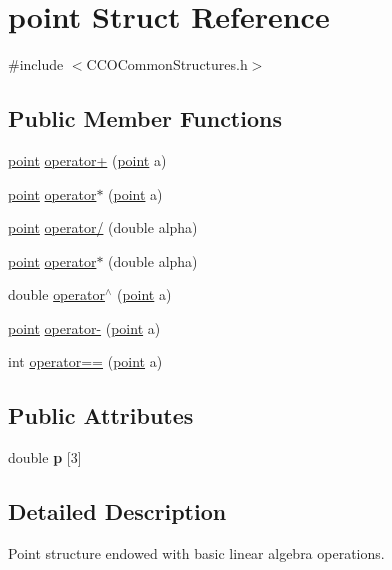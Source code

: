 \hypertarget{structpoint}{}\section{point Struct Reference}
\label{structpoint}


{\ttfamily \#include $<$C\+C\+O\+Common\+Structures.\+h$>$}

\subsection*{Public Member Functions}
\begin{DoxyCompactItemize}
\item 
\hyperlink{structpoint}{point} \hyperlink{structpoint_a4c712881b83fd79c9039ccdd5cb99937}{operator+} (\hyperlink{structpoint}{point} a)
\item 
\hyperlink{structpoint}{point} \hyperlink{structpoint_a0d3ae3b14d2b34458eec85fdf10c681f}{operator$\ast$} (\hyperlink{structpoint}{point} a)
\item 
\hyperlink{structpoint}{point} \hyperlink{structpoint_a62e432cd0ea728880fed041a358e1106}{operator/} (double alpha)
\item 
\hyperlink{structpoint}{point} \hyperlink{structpoint_ac02b60d2271155b71546fadb429ff062}{operator$\ast$} (double alpha)
\item 
double \hyperlink{structpoint_acf04c4cee649781e93868bc1ea95e5ae}{operator$^\wedge$} (\hyperlink{structpoint}{point} a)
\item 
\hyperlink{structpoint}{point} \hyperlink{structpoint_aeba7e4e06c7c0da9b68ebeef5f56b6df}{operator-\/} (\hyperlink{structpoint}{point} a)
\item 
int \hyperlink{structpoint_a467f0c3a57bc85ab2851c4c7fd19ae9e}{operator==} (\hyperlink{structpoint}{point} a)
\end{DoxyCompactItemize}
\subsection*{Public Attributes}
\begin{DoxyCompactItemize}
\item 
double {\bfseries p} \mbox{[}3\mbox{]}\hypertarget{structpoint_a261ff1e6d38cdfae2183a88e4d8809e4}{}\label{structpoint_a261ff1e6d38cdfae2183a88e4d8809e4}

\end{DoxyCompactItemize}


\subsection{Detailed Description}
Point structure endowed with basic linear algebra operations. 

